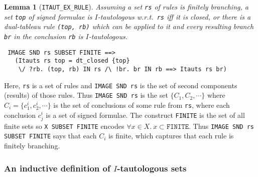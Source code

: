 \documentclass[a4paper]{article}
\newtheorem{lemma}{Lemma}
\newcommand\comment[1]{}
\begin{document}
\begin{lemma}[\texttt{ITAUT\_EX\_RULE}]\label{ITAUT-EX-RULE}
Assuming a set \texttt{rs} of rules is finitely branching,
a set \texttt{top} of signed formulae 
is $I$-tautologous w.r.t.\ \texttt{rs} iff it is closed, 
or there is a dual-tableau rule 
\texttt{(top, rb)}
which can be applied to it and
every resulting branch \texttt{br} in the conclusion 
\texttt{rb} is $I$-tautologous.
\begin{verbatim}
 IMAGE SND rs SUBSET FINITE ==> 
   (Itauts rs top = dt_closed {top} 
    \/ ?rb. (top, rb) IN rs /\ !br. br IN rb ==> Itauts rs br)
\end{verbatim}
\end{lemma}

Here, \texttt{rs} is a set of rules and \texttt{IMAGE SND rs} is the
set of second components (results) of those rules. Thus \texttt{IMAGE
  SND rs} is the set $\{C_1, C_2, \cdots\}$ where
$C_i = \{c_1^i, c_2^i, \cdots \}$ is the set of conclusions of some rule
from \texttt{rs}, where each conclusion $c_j^i$ is a set of signed
formulae. The construct \texttt{FINITE} is the set of all finite sets
so \texttt{X SUBSET FINITE} encodes
$\forall x \in X.\ x \subset \mathtt{FINITE}$.
Thus \texttt{IMAGE SND rs SUBSET FINITE} says that each $C_i$ is
finite, which captures that each rule is finitely branching.

\comment{ deleted - referee's comment
\begin{lemma}
\texttt{IMAGE SND rs SUBSET FINITE} means that
every rule in \texttt{rs} is finitely branching.
\end{lemma}
\begin{verbatim}
IMAGE SND rs SUBSET FINITE <=> !t b. (t, b) IN rs ==> FINITE b
\end{verbatim}
}

\subsubsection{An inductive definition of $I$-tautologous sets}
\end{document}
